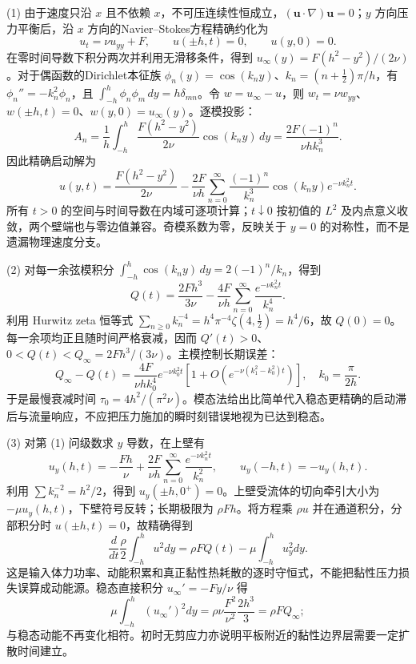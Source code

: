 (1) 由于速度只沿 \(x\) 且不依赖 \(x\)，不可压连续性恒成立，\((\boldsymbol u\cdot\nabla)\boldsymbol u=0\)；\(y\) 方向压力平衡后，沿 \(x\) 方向的Navier--Stokes方程精确约化为
\[
u_t=\nu u_{yy}+F,\qquad u(\pm h,t)=0,\qquad u(y,0)=0.
\]
在零时间导数下积分两次并利用无滑移条件，得到
\(u_\infty(y)=F(h^2-y^2)/(2\nu)\)。对于偶函数的Dirichlet本征族
\(\phi_n(y)=\cos(k_ny)\)、\(k_n=(n+\tfrac12)\pi/h\)，有
\(\phi_n''=-k_n^2\phi_n\)，且
\(\int_{-h}^{h}\phi_n\phi_m\,dy=h\delta_{mn}\)。令 \(w=u_\infty-u\)，则 \(w_t=\nu w_{yy}\)、\(w(\pm h,t)=0\)、\(w(y,0)=u_\infty(y)\)。逐模投影：
\[
A_n=\frac1h\int_{-h}^{h}\frac{F(h^2-y^2)}{2\nu}\cos(k_ny)\,dy
=\frac{2F(-1)^n}{\nu h k_n^3}.
\]
因此精确启动解为
\[
\boxed{u(y,t)=\frac{F(h^2-y^2)}{2\nu}
-\frac{2F}{\nu h}\sum_{n=0}^\infty
\frac{(-1)^n}{k_n^3}\cos(k_ny)e^{-\nu k_n^2t}}.
\]
所有 \(t>0\) 的空间与时间导数在内域可逐项计算；\(t\downarrow0\) 按初值的 \(L^2\) 及内点意义收敛，两个壁端也与零边值兼容。奇模系数为零，反映关于 \(y=0\) 的对称性，而不是遗漏物理速度分支。

(2) 对每一余弦模积分
\(\int_{-h}^h\cos(k_ny)\,dy=2(-1)^n/k_n\)，得到
\[
\boxed{Q(t)=\frac{2Fh^3}{3\nu}
-\frac{4F}{\nu h}\sum_{n=0}^\infty
\frac{e^{-\nu k_n^2t}}{k_n^4}}.
\]
利用 Hurwitz zeta 恒等式
\(\sum_{n\ge0}k_n^{-4}=h^4\pi^{-4}\zeta(4,\tfrac12)=h^4/6\)，故 \(Q(0)=0\)。每一余项均正且随时间严格衰减，因而 \(Q'(t)>0\)、\(0<Q(t)<Q_\infty=2Fh^3/(3\nu)\)。主模控制长期误差：
\[
Q_\infty-Q(t)=\frac{4F}{\nu h k_0^4}
e^{-\nu k_0^2t}\left[1+O(e^{-\nu(k_1^2-k_0^2)t})\right],
\quad k_0=\frac{\pi}{2h}.
\]
于是最慢衰减时间
\(\boxed{\tau_0=4h^2/(\pi^2\nu)}\)。模态法给出比简单代入稳态更精确的启动滞后与流量响应，不应把压力施加的瞬时刻错误地视为已达到稳态。

(3) 对第 (1) 问级数求 \(y\) 导数，在上壁有
\[
u_y(h,t)=-\frac{Fh}{\nu}
+\frac{2F}{\nu h}\sum_{n=0}^\infty
\frac{e^{-\nu k_n^2t}}{k_n^2},
\qquad u_y(-h,t)=-u_y(h,t).
\]
利用 \(\sum k_n^{-2}=h^2/2\)，得到 \(u_y(\pm h,0^+)=0\)。上壁受流体的切向牵引大小为 \(-\mu u_y(h,t)\)，下壁符号反转；长期极限为 \(\rho Fh\)。将方程乘 \(\rho u\) 并在通道积分，分部积分时 \(u(\pm h,t)=0\)，故精确得到
\[
\boxed{\frac{d}{dt}\frac{\rho}{2}\int_{-h}^{h}u^2dy
=\rho FQ(t)-\mu\int_{-h}^{h}u_y^2dy}.
\]
这是输入体力功率、动能积累和真正黏性热耗散的逐时守恒式，不能把黏性压力损失误算成动能源。稳态直接积分 \(u_\infty'=-Fy/\nu\) 得
\[
\mu\int_{-h}^h(u_\infty')^2dy
=\rho\nu\frac{F^2}{\nu^2}\frac{2h^3}{3}
=\rho FQ_\infty;
\]
与稳态动能不再变化相符。初时无剪应力亦说明平板附近的黏性边界层需要一定扩散时间建立。

